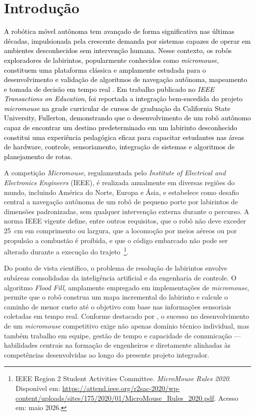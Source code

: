 \chapter[Introdução]{Introdução}

\textcolor{black}{
A robótica móvel autônoma tem avançado de forma significativa nas últimas décadas,
impulsionada pela crescente demanda por sistemas capazes de operar em ambientes
desconhecidos sem intervenção humana.
Nesse contexto, os robôs exploradores de labirintos, popularmente conhecidos como
\textit{micromouse}, constituem uma plataforma clássica e amplamente estudada para
o desenvolvimento e validação de algoritmos de navegação autônoma, mapeamento e
tomada de decisão em tempo real \cite{387215}.
Em trabalho publicado no \textit{IEEE Transactions on Education}, foi reportada a
integração bem-sucedida do projeto \textit{micromouse} na grade curricular de cursos
de graduação da California State University, Fullerton, demonstrando que o
desenvolvimento de um robô autônomo capaz de encontrar um destino predeterminado
em um labirinto desconhecido constitui uma experiência pedagógica eficaz para
capacitar estudantes nas áreas de hardware, controle, sensoriamento, integração de
sistemas e algoritmos de planejamento de rotas.
}

A competição \textit{Micromouse}, regulamentada pelo
\textit{Institute of Electrical and Electronics Engineers} (IEEE),
é realizada anualmente em diversas regiões do mundo, incluindo América do Norte,
Europa e Ásia, e estabelece como desafio central a navegação autônoma de um robô
de pequeno porte por labirintos de dimensões padronizadas, sem qualquer intervenção
externa durante o percurso.
A norma IEEE vigente define, entre outros requisitos, que o robô não deve exceder
25~cm em comprimento ou largura, que a locomoção por meios aéreos ou por propulsão
a combustão é proibida, e que o código embarcado não pode ser alterado durante a
execução do trajeto~\footnote{
    IEEE Region 2 Student Activities Committee.
    \textit{MicroMouse Rules 2020}.
    Disponível em: \url{https://attend.ieee.org/r2sac-2020/wp-content/uploads/sites/175/2020/01/MicroMouse_Rules_2020.pdf}.
    Acesso em: maio 2026.
}.

Do ponto de vista científico, o problema de resolução de labirintos envolve subáreas
consolidadas da inteligência artificial e da engenharia de controle.
O algoritmo \textit{Flood Fill}, amplamente empregado em implementações de
\textit{micromouse}, permite que o robô construa um mapa incremental do labirinto
e calcule o caminho de menor custo até o objetivo com base nas informações sensoriais
coletadas em tempo real.
Conforme destacado por \cite{387215}, o sucesso no desenvolvimento de um
\textit{micromouse} competitivo exige não apenas domínio técnico individual,
mas também trabalho em equipe, gestão de tempo e capacidade de comunicação ---
habilidades centrais na formação de engenheiros e diretamente alinhadas às
competências desenvolvidas ao longo do presente projeto integrador.


